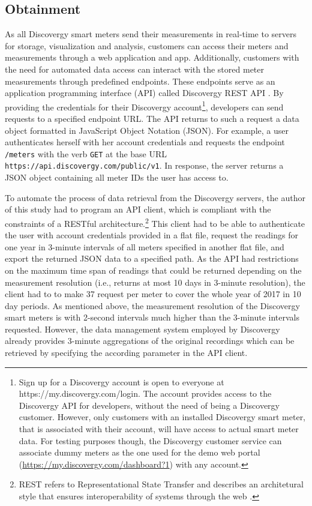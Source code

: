 
\subsection{Obtainment}\label{Sec:Data;Subsec:Obtainment}

As all Discovergy smart meters send their measurements in real-time to servers for storage, visualization and analysis, customers can access their meters and measurements through a web application and app. Additionally, customers with the need for automated data access can interact with the stored meter measurements through predefined endpoints. These endpoints serve as an application programming interface (API) called Discovergy REST API \citep{DiscovergyAPI:2018}. By providing the credentials for their Discovergy account\footnote{Sign up for a Discovergy account is open to everyone at https://my.discovergy.com/login. The account provides access to the Discovergy API for developers, without the need of being a Discovergy customer. However, only customers with an installed Discovergy smart meter, that is associated with their account, will have access to actual smart meter data. For testing purposes though, the Discovergy customer service can associate dummy meters as the one used for the demo web portal (\href{https://my.discovergy.com/dashboard?1}{https://my.discovergy.com/dashboard?1}) with any account.}, developers can send requests to a specified endpoint URL. The API returns to such a request a data object formatted in JavaScript Object Notation (JSON). For example, a user authenticates herself with her account credentials and requests the endpoint \texttt{/meters} with the verb \texttt{GET} at the base URL \texttt{https://api.discovergy.com/public/v1}. In response, the server returns a JSON object containing all meter IDs the user has access to.

To automate the process of data retrieval from the Discovergy servers, the author of this study had to program an API client, which is compliant with the constraints of a RESTful architecture.\footnote{REST refers to Representational State Transfer and describes an architetural style that ensures interoperability of systems through the web \cite[][Ch. 5]{fielding:2000}.} This client  had to be able to authenticate the user with account credentials provided in a flat file, request the readings for one year in 3-minute intervals of all meters specified in another flat file, and export the returned JSON data to a specified path. As the API had restrictions on the maximum time span of readings that could be returned depending on the measurement resolution (i.e., returns at most 10 days in 3-minute resolution), the client had to to make 37 request per meter to cover the whole year of 2017 in 10 day periods. As mentioned above, the measurement resolution of the Discovergy smart meters is with 2-second intervals much higher than the 3-minute intervals requested. However, the data management system employed by Discovergy already provides 3-minute aggregations of the original recordings which can be retrieved by specifying the according parameter in the API client.

